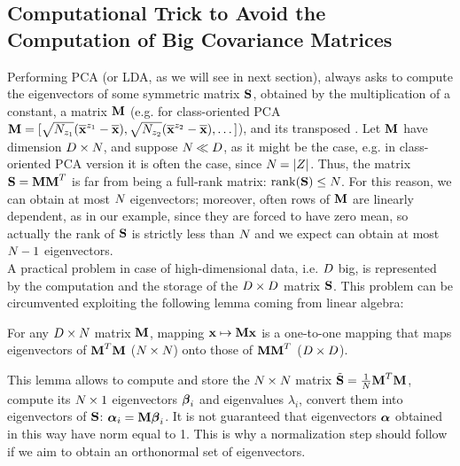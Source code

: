 \subsection{Computational Trick to Avoid the Computation of Big Covariance Matrices}
Performing PCA (or LDA, as we will see in next section), always asks to compute the eigenvectors of some symmetric matrix $\covmat$, obtained by the multiplication of a constant, a matrix $\measuresMatrix$ (e.g. for class-oriented PCA $\measuresMatrix = [\sqrt{\numTraces[\sensVar_1]}(\mmmXclass[\sensVar_1]-\mmmX),\sqrt{\numTraces[\sensVar_2]}(\mmmXclass[\sensVar_2]-\mmmX), \dots ]$), and its transposed . Let $\measuresMatrix$ have dimension $\traceLength\times\numTraces[]$, and suppose $\numTraces[]\ll \traceLength$, as it might be the case, e.g. in class-oriented PCA version it is often the case, since $\numTraces[]=\lvert \sensRandVar \rvert$. Thus, the matrix $\covmat=\measuresMatrix\measuresMatrix^T$ is far from being a full-rank matrix: $\mathrm{rank}(\covmat)\leq \numTraces[]$. For this reason, we can obtain at most $\numTraces[]$ eigenvectors; moreover, often rows of $\measuresMatrix$ are linearly dependent, as in our example, since they are forced to have zero mean, so actually the rank of $\covmat$ is strictly less than $\numTraces[]$ and we expect can obtain at most $\numTraces[]-1$ eigenvectors.\\
A practical problem in case of high-dimensional data, i.e. $\traceLength$ big, is represented by the computation and the storage of the $\traceLength\times\traceLength$ matrix $\covmat$. This problem can be circumvented exploiting the following lemma coming from linear algebra:
\begin{lemma}
For any $\traceLength\times\numTraces[]$ matrix $\measuresMatrix$, mapping $\xxx\mapsto \measuresMatrix \xxx$ is a one-to-one mapping that maps eigenvectors of  $\measuresMatrix^T\measuresMatrix$ ($\numTraces[]\times\numTraces[]$)    onto those of   $\measuresMatrix\measuresMatrix^T$ ($\traceLength\times\traceLength$).
\end{lemma}
%
This lemma allows to compute and store the $\numTraces[]\times\numTraces[]$ matrix $\tilde{\covmat} = \frac{1}{\numTraces[]}\measuresMatrix^T\measuresMatrix$, compute its $\numTraces[]\times 1$ eigenvectors $\BBeta_i$ and eigenvalues $\lambda_i$, convert them into eigenvectors of $\covmat$: $\AAlpha_i = \measuresMatrix\BBeta_i$. It is not guaranteed that eigenvectors $\AAlpha$ obtained in this way have norm equal to 1. This is why a normalization step should follow if we aim to obtain an orthonormal set of eigenvectors.


